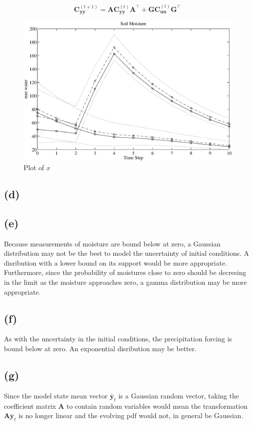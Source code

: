 \documentclass[fleqn, letterpaper]{tufte-handout}
\begin{document}
\[
\mathbf{C}_{\mathbf{yy}}^{(t+1)} = \mathbf{AC}_{\mathbf{yy}}^{(t)}\mathbf{A}^\intercal + \mathbf{GC}_\mathbf{{uu}}^{(t)}\mathbf{G}^\intercal
\]

\begin{figure}
        \includegraphics[width=\textwidth]{ps5figc}
        \caption{Plot of $x$}
        \label{exprnd}
\end{figure}

\subsection{(d)}

\subsection{(e)}

Because measurements of moisture are bound below at zero, a Gaussian distribution may not be the best to model the uncertainty of initial conditions. A disribution with a lower bound on its support would be more appropriate. Furthermore, since the probability of moistures close to zero should be decresing in the limit as the moisture approaches zero, a gamma distribution may be more appropriate.

\subsection{(f)}

As with the uncertainty in the initial conditions, the precipitation forcing is bound below at zero. An exponential disribution may be better. 

\subsection{(g)}

Since the model state mean vector $\bar{\mathbf{y}}_t$ is a Gaussian random vector, taking the coefficient matrix $\mathbf{A}$ to contain random variables would mean the transformation $\mathbf{A}\bar{\mathbf{y}}_t$ is no longer linear and the evolving pdf would not, in general be Gaussian.
\end{document}

